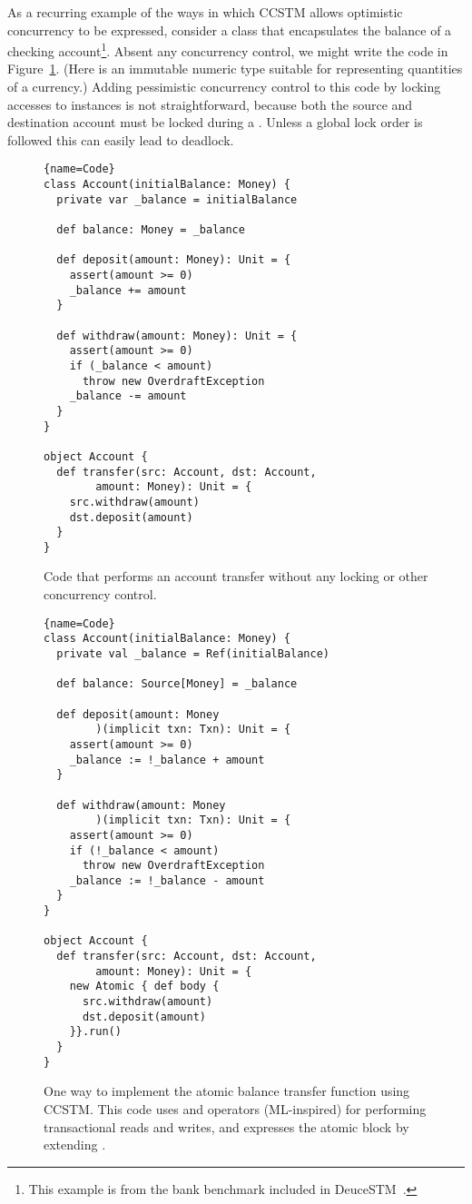 As a recurring example of the ways in which CCSTM allows optimistic concurrency
to be expressed, consider a class that encapsulates the balance of a
checking account\footnote{This example is from the bank benchmark included
in DeuceSTM~\cite{deucestm}.}.  Absent any concurrency control, we might
write the code in Figure~\ref{fig:example:nosync}.  (Here 
is an immutable numeric type suitable for representing quantities of
a currency.)  Adding pessimistic concurrency control to this code by
locking accesses to  instances is not straightforward,
because both the source and destination account must be locked during
a .  Unless a global lock order is followed this can
easily lead to deadlock.

\begin{figure}
\begin{lstlisting}{name=Code}
class Account(initialBalance: Money) {
  private var _balance = initialBalance

  def balance: Money = _balance

  def deposit(amount: Money): Unit = {
    assert(amount >= 0)
    _balance += amount
  }

  def withdraw(amount: Money): Unit = {
    assert(amount >= 0)
    if (_balance < amount)
      throw new OverdraftException
    _balance -= amount
  }
}

object Account {
  def transfer(src: Account, dst: Account,
        amount: Money): Unit = {
    src.withdraw(amount)
    dst.deposit(amount)
  }
}
\end{lstlisting}

\caption{Code that performs an account transfer without
any locking or other concurrency control.}

\label{fig:example:nosync}
\end{figure}

\begin{figure}
\begin{lstlisting}{name=Code}
class Account(initialBalance: Money) {
  private val _balance = Ref(initialBalance)

  def balance: Source[Money] = _balance

  def deposit(amount: Money
        )(implicit txn: Txn): Unit = {
    assert(amount >= 0)
    _balance := !_balance + amount
  }

  def withdraw(amount: Money
        )(implicit txn: Txn): Unit = {
    assert(amount >= 0)
    if (!_balance < amount)
      throw new OverdraftException
    _balance := !_balance - amount
  }
}

object Account {
  def transfer(src: Account, dst: Account,
        amount: Money): Unit = {
    new Atomic { def body {
      src.withdraw(amount)
      dst.deposit(amount)
    }}.run()
  }
}
\end{lstlisting}

\caption{One way to implement the atomic balance transfer function
using CCSTM.  This code uses  and \code{:=} operators
(ML-inspired) for performing transactional reads and writes, and
expresses the atomic block by extending .}

\label{fig:example:ccstm}
\end{figure}

